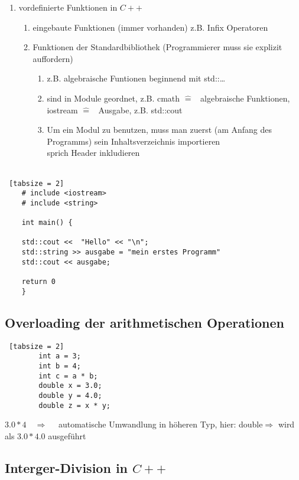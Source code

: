 \documentclass{article}
\begin{document}
\begin{enumerate}
		\item vordefinierte Funktionen in $C++$
		\begin{enumerate}
			\item eingebaute Funktionen (immer vorhanden) z.B. Infix Operatoren
			\item Funktionen der Standardbibliothek (Programmierer muss sie explizit auffordern)
			\begin{enumerate}
				\item z.B. algebraische Funtionen beginnend mit std::\dots
				\item sind in Module geordnet, z.B. cmath $\widehat{=}$ \, algebraische Funktionen, iostream $\widehat{=}$ \, Ausgabe, z.B. std::cout
				\item Um ein Modul zu benutzen, muss man zuerst (am Anfang des Programms) sein Inhaltsverzeichnis importieren \\
				 sprich \grqq Header inkludieren\grqq \\
				 \\
			\end{enumerate}
		\end{enumerate}
	\end{enumerate}
	
	\begin{lstlisting} [tabsize = 2]
	# include <iostream> 
	# include <string> 
	
	int main() {
	
	std::cout <<  "Hello" << "\n";
	std::string >> ausgabe = "mein erstes Programm"
	std::cout << ausgabe;
	
	return 0
	}
	\end{lstlisting}
	
	\subsection{Overloading der arithmetischen Operationen}
	
	\begin{lstlisting} [tabsize = 2]
		int a = 3;
		int b = 4;
		int c = a * b;
		double x = 3.0;
		double y = 4.0;
		double z = x * y;
	\end{lstlisting}
	$3.0 * 4 \quad \Rightarrow \quad$ automatische Umwandlung in höheren Typ, hier: \grqq double\grqq $\Rightarrow$ wird als $3.0 * 4.0$ ausgeführt \\
	
	\subsection{Interger-Division in $C++$}
	
\end{document}
